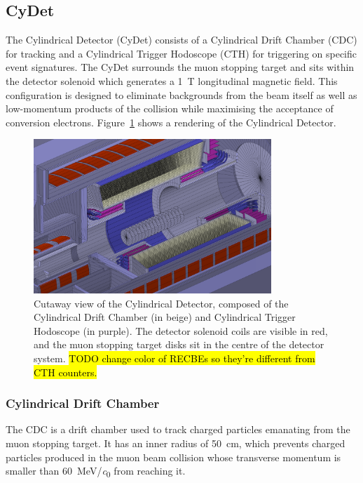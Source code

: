 \subsection{CyDet}
The Cylindrical Detector (CyDet) consists of a Cylindrical Drift Chamber (CDC)
for tracking and a Cylindrical Trigger Hodoscope (CTH) for triggering on
specific event signatures. The CyDet surrounds the muon stopping target and sits
within the detector solenoid which generates a \SI{1}{\tesla} longitudinal
magnetic field. This configuration is designed to eliminate backgrounds from the
beam itself as well as low-momentum products of the collision while maximising
the acceptance of conversion electrons.
Figure~\ref{fig:cydet} shows a rendering of the Cylindrical Detector.

\begin{figure}
    \centering
    \includegraphics[width=0.8\textwidth]{chapter2/cydet.pdf}
    \caption{ Cutaway view of the Cylindrical Detector, composed of the
        Cylindrical Drift Chamber (in beige) and Cylindrical Trigger Hodoscope
        (in purple). The detector solenoid coils are visible in red, and the
        muon stopping target disks sit in the centre of the detector system.
        \hl{TODO change color of RECBEs so they're different from CTH counters.}
        }
    \label{fig:cydet}
\end{figure}

\subsubsection{Cylindrical Drift Chamber}
The CDC is a drift chamber used to track charged particles emanating from the
muon stopping target. It has an inner radius of \SI{50}{\cm}, which prevents
charged particles produced in the muon beam collision whose transverse momentum
is smaller than \SI{60}{\MeV/\clight} from reaching it. 

